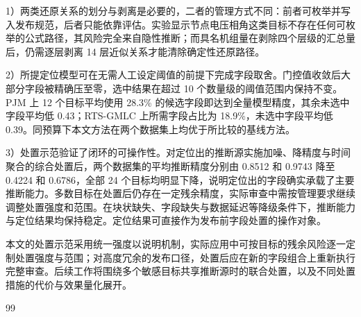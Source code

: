 \documentclass[UTF8,zihao=5,twoside]{ctexart}
\begin{document}
1）两类还原关系的划分与剥离是必要的，二者的管理方式不同：前者可枚举并写入发布规范，后者只能依靠评估。实验显示节点电压相角这类目标不存在任何可枚举的公式路径，其风险完全来自隐性推断；而具名机组量在剥除四个层级的汇总量后，仍需逐层剥离 14 层近似关系才能清除确定性还原路径。

2）所提定位模型可在无需人工设定阈值的前提下完成字段取舍。门控值收敛后大部分字段被精确压至零，选中结果在超过 10 个数量级的阈值范围内保持不变。PJM 上 12 个目标平均使用 28.3\% 的候选字段即达到全量模型精度，其余未选中字段平均低 0.43；RTS-GMLC 上所需字段占比为 18.9\%，未选中字段平均低 0.39。同预算下本文方法在两个数据集上均优于所比较的基线方法。

3）处置示范验证了闭环的可操作性。对定位出的推断源实施加噪、降精度与时间聚合的综合处置后，两个数据集的平均推断精度分别由 0.8512 和 0.9743 降至 0.4224 和 0.6786，全部 24 个目标均明显下降，说明定位出的字段确实承载了主要推断能力。多数目标在处置后仍存在一定残余精度，实际审查中需按管理要求继续调整处置强度和范围。在块状缺失、字段缺失与数据延迟等降级条件下，推断能力与定位结果均保持稳定。定位结果可直接作为发布前字段处置的操作对象。

本文的处置示范采用统一强度以说明机制，实际应用中可按目标的残余风险逐一定制处置强度与范围；对高度冗余的发布口径，处置后应在新的字段组合上重新执行完整审查。后续工作将围绕多个敏感目标共享推断源时的联合处置，以及不同处置措施的代价与效果量化展开。

\begin{thebibliography}{99}
\setlength{\itemsep}{0.15ex}\setlength{\parskip}{0pt}

\end{thebibliography}

\vspace{0.6em}
\end{document}
